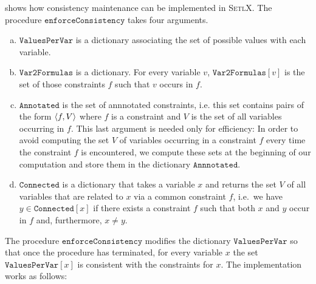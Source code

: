\noindent
{} shows how consistency maintenance can be implemented in \textsc{SetlX}.
The procedure $\texttt{enforceConsistency}$ takes four arguments.
\begin{enumerate}[(a)]
\item $\texttt{ValuesPerVar}$ is a dictionary associating the set of possible values with each variable.
\item $\texttt{Var2Formulas}$ is a dictionary.  For every variable $v$, $\texttt{Var2Formulas}[v]$ is
      the set of those constraints $f$ such that $v$ occurs in $f$.
\item $\texttt{Annotated}$ is the set of annnotated constraints, i.e. this set contains
      pairs of the form $\pair(f, V)$ where $f$ is a constraint and $V$ is the set of all variables occurring
      in $f$.  This last argument is needed only for efficiency: In order to avoid computing the set $V$ of
      variables occurring in a constraint $f$ every time the constraint $f$ is encountered, we compute these
      sets at the beginning of our computation and store them in the dictionary $\texttt{Annnotated}$.
\item $\texttt{Connected}$ is a dictionary that takes a variable $x$ and returns the set $V$ of all variables
      that are related to $x$ via a common constraint $f$, i.e.~we have $y \in \texttt{Connected}[x]$
      if there exists a constraint $f$ such that both $x$ and $y$ occur in $f$ and, furthermore, $x \not= y$.
\end{enumerate}
The procedure $\texttt{enforceConsistency}$ modifies the dictionary $\texttt{ValuesPerVar}$ so that once the
procedure has terminated, for every variable $x$ the set
$\texttt{ValuesPerVar}[x]$ is consistent with the constraints for $x$.  The implementation works as follows:

